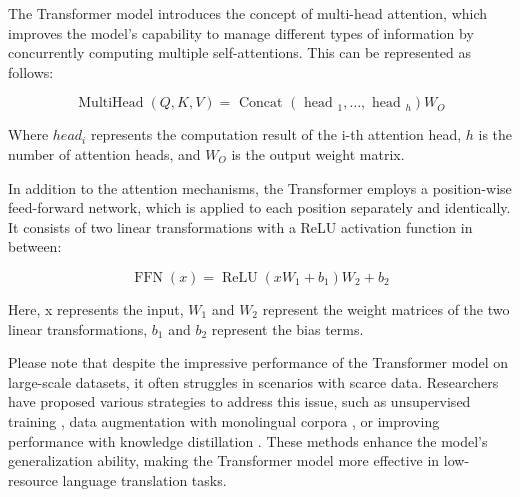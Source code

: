 \documentclass[acmsmall]{acmart}
\begin{document}
The Transformer model introduces the concept of multi-head attention, which improves the model's capability to manage different types of information by concurrently computing multiple self-attentions. This can be represented as follows:


\begin{equation}
\operatorname{MultiHead}(Q, K, V)=\text { Concat }\left(\text { head }_1, \ldots, \text { head }_h\right) W_O
\end{equation}

Where $head_i$ represents the computation result of the i-th attention head, $h$ is the number of attention heads, and $W_O$ is the output weight matrix.

In addition to the attention mechanisms, the Transformer employs a position-wise feed-forward network, which is applied to each position separately and identically. It consists of two linear transformations with a ReLU activation function in between:

\begin{equation}
\operatorname{FFN}(x)=\operatorname{ReLU}\left(x W_1+b_1\right) W_2+b_2
\end{equation}

Here, x represents the input, $W_1$ and $W_2$ represent the weight matrices of the two linear transformations, $b_1$ and $b_2$ represent the bias terms.

Please note that despite the impressive performance of the Transformer model on large-scale datasets, it often struggles in scenarios with scarce data. Researchers have proposed various strategies to address this issue, such as unsupervised training \cite{3-4}, data augmentation with monolingual corpora \cite{3-5}, or improving performance with knowledge distillation \cite{3-6}. These methods enhance the model's generalization ability, making the Transformer model more effective in low-resource language translation tasks.
\end{document}
